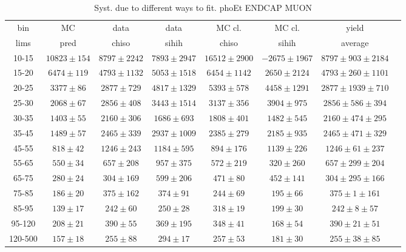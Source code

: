 \begin{table}[h]
  \scriptsize
  \begin{center}
  \caption{Syst. due to different ways to fit. phoEt ENDCAP MUON}
  \begin{tabular}{|c|c|c|c|c|c|c|c|}
    bin &  MC   & data  & data  & MC cl. & MC cl. & yield \\ 
    lims & pred & chiso & sihih & chiso  & sihih  & average\\ \hline
    10-15 & $10823\pm154$ & $8797\pm2242$ & $7893\pm2947$ & $16512\pm2900$ & $-2675\pm1967$ &$8797\pm903\pm2184$  \\ \hline
    15-20 & $6474\pm119$ & $4793\pm1132$ & $5053\pm1518$ & $6454\pm1142$ & $2650\pm2124$ &$4793\pm260\pm1101$  \\ \hline
    20-25 & $3377\pm86$ & $2877\pm729$ & $4817\pm1329$ & $5393\pm578$ & $4458\pm1291$ &$2877\pm1939\pm710$  \\ \hline
    25-30 & $2068\pm67$ & $2856\pm408$ & $3443\pm1514$ & $3137\pm356$ & $3904\pm975$ &$2856\pm586\pm394$  \\ \hline
    30-35 & $1403\pm55$ & $2160\pm306$ & $1686\pm693$ & $1808\pm401$ & $1482\pm545$ &$2160\pm474\pm295$  \\ \hline
    35-45 & $1489\pm57$ & $2465\pm339$ & $2937\pm1009$ & $2385\pm279$ & $2185\pm935$ &$2465\pm471\pm329$  \\ \hline
    45-55 & $818\pm42$ & $1246\pm243$ & $1184\pm595$ & $894\pm176$ & $1139\pm226$ &$1246\pm61\pm237$  \\ \hline
    55-65 & $550\pm34$ & $657\pm208$ & $957\pm375$ & $572\pm219$ & $320\pm260$ &$657\pm299\pm204$  \\ \hline
    65-75 & $280\pm24$ & $304\pm169$ & $599\pm206$ & $471\pm80$ & $452\pm141$ &$304\pm295\pm166$  \\ \hline
    75-85 & $186\pm20$ & $375\pm162$ & $374\pm91$ & $244\pm69$ & $195\pm66$ &$375\pm1\pm161$  \\ \hline
    85-95 & $139\pm17$ & $242\pm60$ & $250\pm28$ & $318\pm19$ & $199\pm30$ &$242\pm8\pm57$  \\ \hline
    95-120 & $208\pm21$ & $390\pm55$ & $369\pm195$ & $348\pm41$ & $168\pm54$ &$390\pm21\pm51$  \\ \hline
    120-500 & $157\pm18$ & $255\pm88$ & $294\pm17$ & $257\pm53$ & $181\pm30$ &$255\pm38\pm85$  \\ \hline
  \end{tabular}
  \label{tab:diff_ways_to_fit_phoEt_ENDCAP_muon}
  \end{center}
\end{table}


